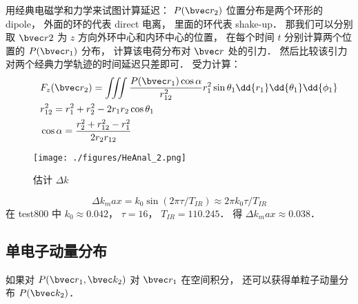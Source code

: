 用经典电磁学和力学来试图计算延迟： $P(\bvec r_2)$ 位置分布是两个环形的 dipole， 外面的环的代表 direct 电离， 里面的环代表 shake-up． 那我们可以分别取 $\bvec r2$ 为 $z$ 方向外环中心和内环中心的位置， 在每个时间 $t$ 分别计算两个位置的 $P(\bvec r_1)$ 分布， 计算该电荷分布对 $\bvec r$ 处的引力． 然后比较该引力对两个经典力学轨迹的时间延迟只差即可． 受力计算：
\begin{equation}
\begin{aligned}
&F_z(\bvec r_2) = \iiint \frac{P(\bvec r_1) \cos\alpha}{r_{12}^2} r_1^2\sin\theta_1 \dd{r_1}\dd{\theta_1}\dd{\phi_1}\\
\qquad
&r_{12}^2 = r_1^2 + r_2^2 - 2r_1r_2 \cos\theta_1\\
&\cos\alpha = \frac{r_2^2 + r_{12}^2 - r_1^2}{2r_2 r_{12}}
\end{aligned}
\end{equation}

\begin{figure}[ht]
\centering
\texttt{[image: ./figures/HeAnal\_2.png]}
\caption{估计 $\Delta k$} \label{HeAnal_fig2}
\end{figure}
\begin{equation}
\Delta k_max = k_0 \sin(2\pi \tau/T_{IR}) \approx 2 \pi k_0  \tau/T_{IR}
\end{equation}
在 test800 中 $k_0 \approx 0.042$， $\tau = 16$， $T_{IR} = 110.245$． 得 $\Delta k_max \approx 0.038$．

\subsection{单电子动量分布}
如果对 $P(\bvec r_1, \bvec k_2)$ 对 $\bvec r_1$ 在空间积分， 还可以获得单粒子动量分布 $P(\bvec k_2)$．
